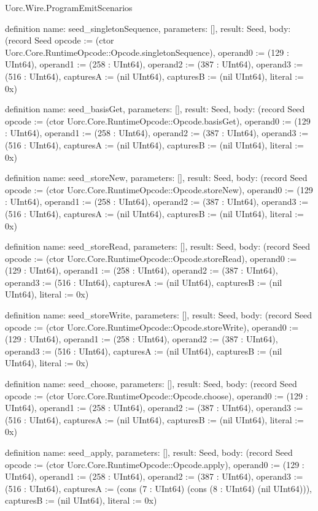 \begin{lexlean}{Uorc.Wire.ProgramEmitScenarios}
\begin{semanticmodule}
definition{
  name: seed_singletonSequence,
  parameters: [],
  result: Seed,
  body: (record Seed {opcode := (ctor Uorc.Core.RuntimeOpcode::Opcode.singletonSequence), operand0 := (129 : UInt64), operand1 := (258 : UInt64), operand2 := (387 : UInt64), operand3 := (516 : UInt64), capturesA := (nil UInt64), capturesB := (nil UInt64), literal := 0x})
}

definition{
  name: seed_basisGet,
  parameters: [],
  result: Seed,
  body: (record Seed {opcode := (ctor Uorc.Core.RuntimeOpcode::Opcode.basisGet), operand0 := (129 : UInt64), operand1 := (258 : UInt64), operand2 := (387 : UInt64), operand3 := (516 : UInt64), capturesA := (nil UInt64), capturesB := (nil UInt64), literal := 0x})
}

definition{
  name: seed_storeNew,
  parameters: [],
  result: Seed,
  body: (record Seed {opcode := (ctor Uorc.Core.RuntimeOpcode::Opcode.storeNew), operand0 := (129 : UInt64), operand1 := (258 : UInt64), operand2 := (387 : UInt64), operand3 := (516 : UInt64), capturesA := (nil UInt64), capturesB := (nil UInt64), literal := 0x})
}

definition{
  name: seed_storeRead,
  parameters: [],
  result: Seed,
  body: (record Seed {opcode := (ctor Uorc.Core.RuntimeOpcode::Opcode.storeRead), operand0 := (129 : UInt64), operand1 := (258 : UInt64), operand2 := (387 : UInt64), operand3 := (516 : UInt64), capturesA := (nil UInt64), capturesB := (nil UInt64), literal := 0x})
}

definition{
  name: seed_storeWrite,
  parameters: [],
  result: Seed,
  body: (record Seed {opcode := (ctor Uorc.Core.RuntimeOpcode::Opcode.storeWrite), operand0 := (129 : UInt64), operand1 := (258 : UInt64), operand2 := (387 : UInt64), operand3 := (516 : UInt64), capturesA := (nil UInt64), capturesB := (nil UInt64), literal := 0x})
}

definition{
  name: seed_choose,
  parameters: [],
  result: Seed,
  body: (record Seed {opcode := (ctor Uorc.Core.RuntimeOpcode::Opcode.choose), operand0 := (129 : UInt64), operand1 := (258 : UInt64), operand2 := (387 : UInt64), operand3 := (516 : UInt64), capturesA := (nil UInt64), capturesB := (nil UInt64), literal := 0x})
}

definition{
  name: seed_apply,
  parameters: [],
  result: Seed,
  body: (record Seed {opcode := (ctor Uorc.Core.RuntimeOpcode::Opcode.apply), operand0 := (129 : UInt64), operand1 := (258 : UInt64), operand2 := (387 : UInt64), operand3 := (516 : UInt64), capturesA := (cons (7 : UInt64) (cons (8 : UInt64) (nil UInt64))), capturesB := (nil UInt64), literal := 0x})
}


\end{semanticmodule}
\end{lexlean}
